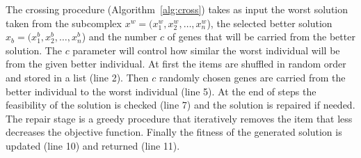 The crossing procedure (Algorithm~\ref{alg:cross}) takes as input the worst
solution taken from the subcomplex $x^w = (x^w_1, x^w_2, \ldots, x^w_n$),
the selected better solution $x_b = (x^b_1, x^b_2, \ldots, x^b_n$)
and the number $c$ of genes that will be carried from the better solution.
The $c$ parameter will control how similar the worst individual will be from the
given better individual.
At first the items are shuffled in random order and stored in a list (line 2).
Then $c$ randomly chosen genes are carried from the better individual to the worst
individual (line 5).
At the end of steps the feasibility of the solution is checked (line 7) and
the solution is repaired if needed.
The repair stage is a greedy procedure that iteratively removes the item that less
decreases the objective function.
Finally the fitness of the generated solution is updated (line 10) and
returned (line 11).


